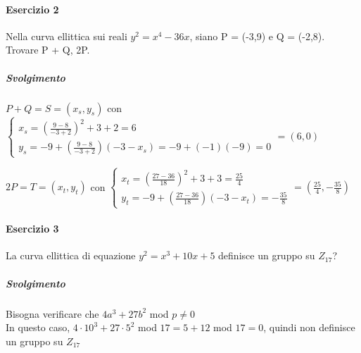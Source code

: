 \documentclass[10pt]{book}
\begin{document}
\paragraph{Esercizio 2} Nella curva ellittica sui reali $y^2 = x^4 - 36x$, siano P = (-3,9) e Q = (-2,8).\\
Trovare P + Q, 2P.
\subparagraph{Svolgimento}\begin{list}{}{Formule a p.48} 
	\item $P + Q = S = (x_s, y_s)$ con $\left\{\begin{array}{l}
		x_s = \left(\frac{9-8}{-3+2}\right)^2 + 3 + 2 = 6\\
		y_s = -9 + \left(\frac{9-8}{-3+2}\right)\left(-3-x_s\right) = -9 + (-1)(-9) = 0
	\end{array}\right. = (6,0)$
	\item $2P = T = (x_t, y_t)$ con $\left\{\begin{array}{l}
	x_t = \left(\frac{27 - 36}{18}\right)^2 + 3 + 3 = \frac{25}{4}\\
	y_t = -9 + \left(\frac{27 - 36}{18}\right)(-3-x_t)= -\frac{35}{8} 
	\end{array}\right. = \left(\frac{25}{4},-\frac{35}{8}\right)
	$
\end{list}
\paragraph{Esercizio 3} La curva ellittica di equazione $y^2 = x^3 + 10x + 5$ definisce un gruppo su $Z_{17}$?
\subparagraph{Svolgimento} Bisogna verificare che $4a^3 + 27b^2$ mod $p \neq 0$\\
In questo caso, $4\cdot10^3 + 27\cdot5^2$ mod $17 = 5+12$ mod $17 = 0$, quindi non definisce un gruppo su $Z_{17}$
\pagebreak
\end{document}
